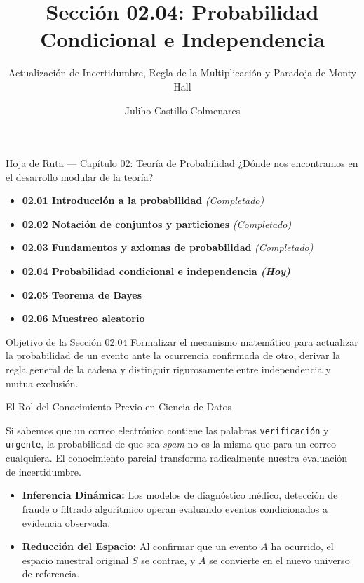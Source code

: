 \documentclass[10pt,aspectratio=169]{beamer}
\title[Probabilidad Condicional e Independencia]{Sección 02.04: Probabilidad Condicional e Independencia}
\subtitle{Actualización de Incertidumbre, Regla de la Multiplicación y Paradoja de Monty Hall}
\author[J. Castillo Colmenares]{Juliho Castillo Colmenares}
\institute{Tecnológico de Monterrey}
\date{}
\begin{document}
\begin{frame}[plain]
  \vspace{-0.8cm}
  \titlepage
\end{frame}

\begin{frame}{Hoja de Ruta — Capítulo 02: Teoría de Probabilidad}
  ¿Dónde nos encontramos en el desarrollo modular de la teoría? \pause
  \begin{itemize}\itemsep=0.1em
    \item \textbf{02.01 Introducción a la probabilidad} \emph{(Completado)} \pause
    \item \textbf{02.02 Notación de conjuntos y particiones} \emph{(Completado)} \pause
    \item \textbf{02.03 Fundamentos y axiomas de probabilidad} \emph{(Completado)} \pause
    \item \color{TecRojo}\textbf{02.04 Probabilidad condicional e independencia \emph{(Hoy)}}\color{black} \pause
    \item \textbf{02.05 Teorema de Bayes} \pause
    \item \textbf{02.06 Muestreo aleatorio}
  \end{itemize}
  \vspace{0.4em}
  \begin{block}{Objetivo de la Sección 02.04}
    Formalizar el mecanismo matemático para actualizar la probabilidad de un evento ante la ocurrencia confirmada de otro, derivar la regla general de la cadena y distinguir rigurosamente entre independencia y mutua exclusión.
  \end{block}
\end{frame}

\begin{frame}{El Rol del Conocimiento Previo en Ciencia de Datos}
  \begin{motivacion}
    Si sabemos que un correo electrónico contiene las palabras \texttt{verificación} y \texttt{urgente}, la probabilidad de que sea \emph{spam} no es la misma que para un correo cualquiera. El conocimiento parcial transforma radicalmente nuestra evaluación de incertidumbre.
  \end{motivacion}
  
  \vspace{0.3em}
  \pause
  \begin{itemize}\itemsep=0.1em
    \item \textbf{Inferencia Dinámica:} Los modelos de diagnóstico médico, detección de fraude o filtrado algorítmico operan evaluando eventos condicionados a evidencia observada. \pause
    \item \textbf{Reducción del Espacio:} Al confirmar que un evento $A$ ha ocurrido, el espacio muestral original $S$ se contrae, y $A$ se convierte en el nuevo universo de referencia.
  \end{itemize}
\end{frame}
\end{document}
